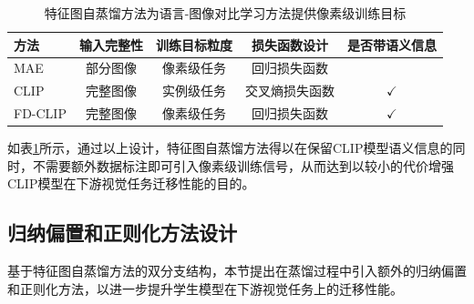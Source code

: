 \begin{table}
\caption{特征图自蒸馏方法为语言-图像对比学习方法提供像素级训练目标}
\centering
  \begin{tabular}{lcccc}
\toprule
  方法 & 输入完整性 & 训练目标粒度 & 损失函数设计 & 是否带语义信息 \\
  \midrule
  MAE & 部分图像 & 像素级任务 & 回归损失函数 & \\
  \midrule
  CLIP & 完整图像 & 实例级任务 & 交叉熵损失函数 & $\checkmark$  \\
  FD-CLIP & 完整图像 & 像素级任务 & 回归损失函数 & $\checkmark$ \\
\bottomrule
  \end{tabular}
\label{tab:fd-method}
\end{table}

如表\ref{tab:fd-method}所示，通过以上设计，特征图自蒸馏方法得以在保留CLIP模型语义信息的同时，不需要额外数据标注即可引入像素级训练信号，从而达到以较小的代价增强CLIP模型在下游视觉任务迁移性能的目的。%

\subsection{归纳偏置和正则化方法设计}
基于特征图自蒸馏方法的双分支结构，本节提出在蒸馏过程中引入额外的归纳偏置和正则化方法，以进一步提升学生模型在下游视觉任务上的迁移性能。

